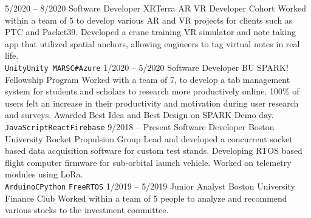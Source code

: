 \documentclass[9pt]{developercv} %
\begin{document}
\begin{entrylist}
	\entry
	{5/2020 -- 8/2020}
	{Software Developer}
	{XRTerra AR VR Developer Cohort}
	{Worked within a team of 5 to develop various AR and VR projects for clients such as PTC
		and Packet39. Developed a crane training VR simulator and note taking app that utilized
		spatial anchors, allowing engineers to tag virtual notes in real life.\\
		\texttt{Unity}\slashsep\texttt{Unity MARS}\slashsep\texttt{C\#}\slashsep\texttt{Azure}}
	\entry
	{1/2020 -- 5/2020}
	{Software Developer}
	{BU SPARK! Fellowship Program}
	{Worked with a team of 7, to develop a tab management system for students and
		scholars to research more productively online. 100\% of users felt an increase in
		their productivity and motivation during user research and surveys. Awarded Best
		Idea and Best Design on SPARK Demo day.\\
		\texttt{JavaScript}\slashsep\texttt{React}\slashsep\texttt{Firebase}}
	\entry
	{9/2018 -- Present}
	{Software Developer}
	{Boston University Rocket Propulsion Group}
	{Lead and developed a concurrent socket based data acquisition software for custom test stands.
		Developing RTOS based flight computer firmware for sub-orbital launch vehicle. Worked
		on telemetry modules using LoRa. \\\texttt{Arduino}\slashsep\texttt{C}\slashsep\texttt{Python}
		\slashsep\texttt{FreeRTOS}}
	\entry
	{1/2019 -- 5/2019}
	{Junior Analyst}
	{Boston University Finance Club}
	{Worked within a team of 5 people to analyze and recommend various stocks to the investment committee.}

\end{entrylist}
\end{document}
